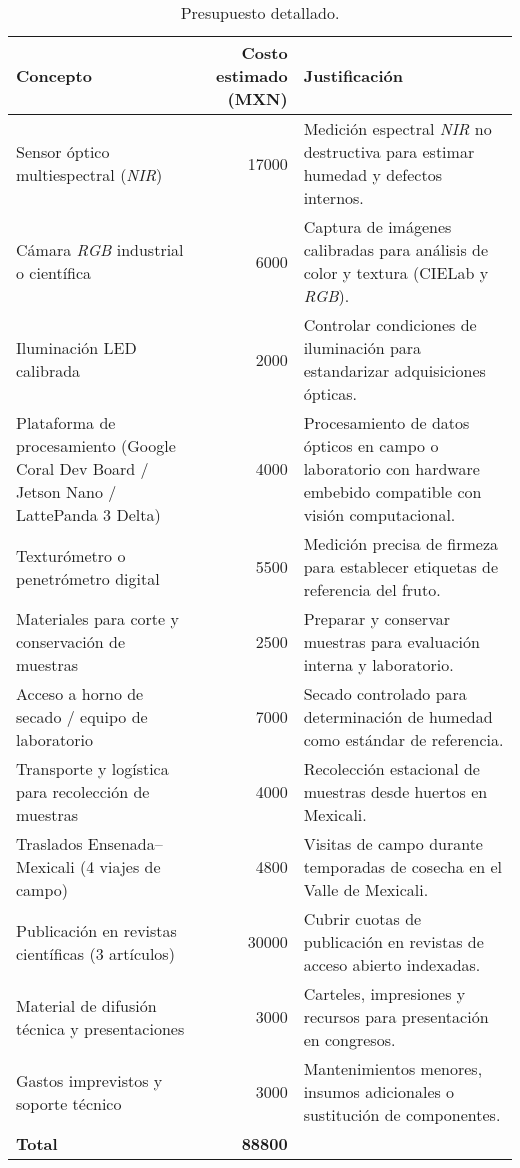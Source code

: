 \begin{table}[h]
\centering
\begin{tabular}{|p{5cm}|r|p{6cm}|}
\hline
\textbf{Concepto} & \textbf{Costo estimado (MXN)} & \textbf{Justificación} \\
\hline
Sensor óptico multiespectral (\textit{NIR}) & 17000 & Medición espectral \textit{NIR} no destructiva para estimar humedad y defectos internos. \\
\hline
Cámara \textit{RGB} industrial o científica & 6000 & Captura de imágenes calibradas para análisis de color y textura (CIELab y \textit{RGB}). \\
\hline
Iluminación LED calibrada & 2000 & Controlar condiciones de iluminación para estandarizar adquisiciones ópticas. \\
\hline
Plataforma de procesamiento (Google Coral Dev Board / Jetson Nano / LattePanda 3 Delta) & 4000 & Procesamiento de datos ópticos en campo o laboratorio con hardware embebido compatible con visión computacional. \\
\hline
Texturómetro o penetrómetro digital & 5500 & Medición precisa de firmeza para establecer etiquetas de referencia del fruto. \\
\hline
Materiales para corte y conservación de muestras & 2500 & Preparar y conservar muestras para evaluación interna y laboratorio. \\
\hline
Acceso a horno de secado / equipo de laboratorio & 7000 & Secado controlado para determinación de humedad como estándar de referencia. \\
\hline
Transporte y logística para recolección de muestras & 4000 & Recolección estacional de muestras desde huertos en Mexicali. \\
\hline
Traslados Ensenada–Mexicali (4 viajes de campo) & 4800 & Visitas de campo durante temporadas de cosecha en el Valle de Mexicali. \\
\hline
Publicación en revistas científicas (3 artículos) & 30000 & Cubrir cuotas de publicación en revistas de acceso abierto indexadas. \\
\hline
Material de difusión técnica y presentaciones & 3000 & Carteles, impresiones y recursos para presentación en congresos. \\
\hline
Gastos imprevistos y soporte técnico & 3000 & Mantenimientos menores, insumos adicionales o sustitución de componentes. \\
\hline
\textbf{Total} & \textbf{88800} & \\
\hline
\end{tabular}
\caption{Presupuesto detallado.}
\label{tab:presupuesto}
\end{table}

